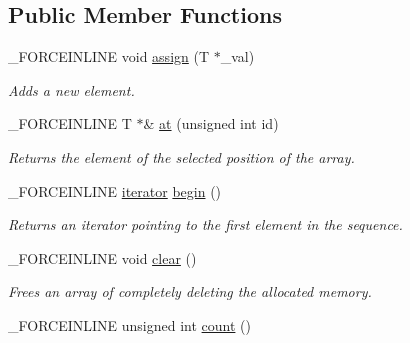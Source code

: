 \subsection*{Public Member Functions}
\begin{DoxyCompactItemize}
\item 
\hypertarget{classbt_1_1_sort_void_vector_a58db31d6ac8eb0b050a97c52241ab82b}{\-\_\-\-F\-O\-R\-C\-E\-I\-N\-L\-I\-N\-E void \hyperlink{classbt_1_1_sort_void_vector_a58db31d6ac8eb0b050a97c52241ab82b}{assign} (T $\ast$\-\_\-val)}\label{classbt_1_1_sort_void_vector_a58db31d6ac8eb0b050a97c52241ab82b}

\begin{DoxyCompactList}\small\item\em Adds a new element. \end{DoxyCompactList}\item 
\hypertarget{classbt_1_1_sort_void_vector_af1ca533e80bf2fb7d146ae00720fae4d}{\-\_\-\-F\-O\-R\-C\-E\-I\-N\-L\-I\-N\-E T $\ast$\& \hyperlink{classbt_1_1_sort_void_vector_af1ca533e80bf2fb7d146ae00720fae4d}{at} (unsigned int id)}\label{classbt_1_1_sort_void_vector_af1ca533e80bf2fb7d146ae00720fae4d}

\begin{DoxyCompactList}\small\item\em Returns the element of the selected position of the array. \end{DoxyCompactList}\item 
\hypertarget{classbt_1_1_sort_void_vector_ac8e736a544383cbc42b604d62256fd5d}{\-\_\-\-F\-O\-R\-C\-E\-I\-N\-L\-I\-N\-E \hyperlink{classbt_1_1_sort_void_vector_1_1iterator}{iterator} \hyperlink{classbt_1_1_sort_void_vector_ac8e736a544383cbc42b604d62256fd5d}{begin} ()}\label{classbt_1_1_sort_void_vector_ac8e736a544383cbc42b604d62256fd5d}

\begin{DoxyCompactList}\small\item\em Returns an iterator pointing to the first element in the sequence. \end{DoxyCompactList}\item 
\hypertarget{classbt_1_1_sort_void_vector_ad377d23ef75a338e936d09a5a2db89b8}{\-\_\-\-F\-O\-R\-C\-E\-I\-N\-L\-I\-N\-E void \hyperlink{classbt_1_1_sort_void_vector_ad377d23ef75a338e936d09a5a2db89b8}{clear} ()}\label{classbt_1_1_sort_void_vector_ad377d23ef75a338e936d09a5a2db89b8}

\begin{DoxyCompactList}\small\item\em Frees an array of completely deleting the allocated memory. \end{DoxyCompactList}\item 
\hypertarget{classbt_1_1_sort_void_vector_aa837bd93ea1e22bcedacee8b01ab4bf6}{\-\_\-\-F\-O\-R\-C\-E\-I\-N\-L\-I\-N\-E unsigned int \hyperlink{classbt_1_1_sort_void_vector_aa837bd93ea1e22bcedacee8b01ab4bf6}{count} ()}\label{classbt_1_1_sort_void_vector_aa837bd93ea1e22bcedacee8b01ab4bf6}


\end{DoxyCompactItemize}
